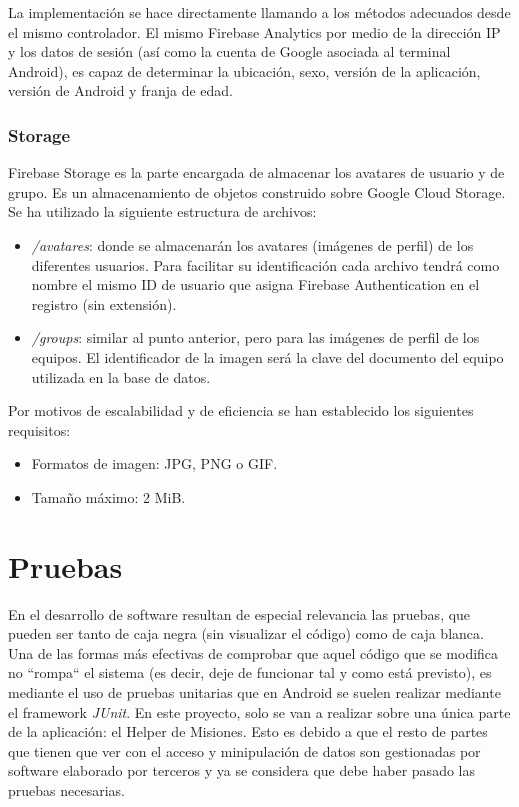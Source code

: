 \documentclass[twoside]{report}
\begin{document}
La implementación se hace directamente llamando a los métodos adecuados desde el mismo controlador. El mismo Firebase Analytics por medio de la dirección IP y los datos de sesión (así como la cuenta de Google asociada al terminal Android), es capaz de determinar la ubicación, sexo, versión de la aplicación, versión de Android y franja de edad.
\subsubsection{Storage}

Firebase Storage es la parte encargada de almacenar los avatares de usuario y de grupo. Es un almacenamiento de objetos construido sobre Google Cloud Storage. \\

Se ha utilizado la siguiente estructura de archivos:
\begin{itemize}
\item \textit{/avatares}: donde se almacenarán los avatares (imágenes de perfil) de los diferentes usuarios. Para facilitar su identificación cada archivo tendrá como nombre el mismo ID de usuario que asigna Firebase Authentication en el registro (sin extensión). 
\item \textit{/groups}: similar al punto anterior, pero para las imágenes de perfil de los equipos. El identificador de la imagen será la clave del documento del equipo utilizada en la base de datos.
\end{itemize}

Por motivos de escalabilidad y de eficiencia se han establecido los siguientes requisitos:
\begin{itemize}
\item Formatos de imagen: JPG, PNG o GIF.
\item Tamaño máximo: 2 MiB.
\end{itemize}


\section{Pruebas}

En el desarrollo de software resultan de especial relevancia las pruebas, que pueden ser tanto de caja negra (sin visualizar el código) como de caja blanca. Una de las formas más efectivas de comprobar que aquel código que se modifica no “rompa“ el sistema (es decir, deje de funcionar tal y como está previsto), es mediante el uso de pruebas unitarias que en Android se suelen realizar mediante el framework \textit{JUnit}. En este proyecto, solo se van a realizar sobre una única parte de la aplicación: el Helper de Misiones. Esto es debido a que el resto de partes que tienen que ver con el acceso y minipulación de datos son gestionadas por software elaborado por terceros y ya se considera que debe haber pasado las pruebas necesarias.
\end{document}
